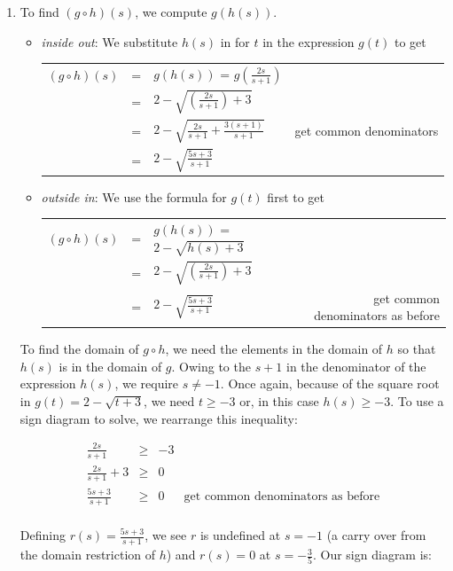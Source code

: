 \documentclass{ximera}
\begin{document}
\begin{example}
\begin{explanation}
\begin{enumerate}
\item  To find $(g \circ h)(s)$, we compute $g(h(s))$. 

\begin{itemize}

\item  \textit{inside out}: We substitute $h(s)$ in for $t$ in the expression $g(t)$  to get 
\begin{longtable}{rclr} $(g \circ h)(s)$ & = & $g(h(s))$ = $g\left(\frac{2s}{s+1}\right)$  & \\
 & = & $2 - \sqrt{\left(\frac{2s}{s+1}\right)+3}$ & \\ 
 & = & $2 - \sqrt{\frac{2s}{s+1} + \frac{3(s+1)}{s+1}}$ & get common denominators\\
 & = & $2 - \sqrt{\frac{5s+3}{s+1}}$ & \\
 \end{longtable}

\item  \textit{outside in}:  We use the formula for $g(t)$ first to get
\begin{longtable}{rclr} $(g \circ h)(s)$ & = & $g(h(s))$ = $2 - \sqrt{h(s)+3}$& \\  
  & = & $2 - \sqrt{\left(\frac{2s}{s+1}\right)+3}$ & \\
 & = & $2 - \sqrt{\frac{5s+3}{s+1}}$ & get common denominators as before\\
 \end{longtable}

\end{itemize}

To find the domain of $g \circ h$, we need the elements in the domain of $h$ so that $h(s)$ is in the domain of $g$.  Owing to the $s+1$ in the denominator of the expression  $h(s)$, we require $s \neq -1$.  Once again, because  of the square root in $g(t) = 2 - \sqrt{t+3}$, we need $t \geq -3$ or, in this case $h(s)  \geq -3$.  To use a sign diagram to solve, we rearrange this inequality:

\[ \begin{array}{rclr}

\frac{2s}{s+1} & \geq & -3 & \\
\frac{2s}{s+1} +3 &   \geq & 0 & \\
\frac{5s+3}{s+1}  & \geq &  0  & \text{get common denominators as before} \\ \end{array} \]

Defining $r(s) = \frac{5s+3}{s+1}$, we see $r$ is undefined at $s=-1$ (a carry over from the domain restriction of $h$) and $r(s) = 0$ at $s = -\frac{3}{5}$. Our sign diagram is:


\end{enumerate}
\end{explanation}
\end{example}
\end{document}
